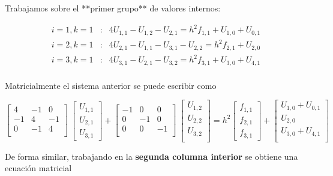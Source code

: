 \documentclass[12pt]{article}
\begin{document}
Trabajamos sobre el **primer grupo** de valores internos:

\begin{eqnarray*}
i=1,k=1 & : & 4 U_{1,1} - U_{1,2} - U_{2,1} = h^2 f_{1,1} + U_{1,0} + U_{0,1} \\
i=2,k=1 & : & 4 U_{2,1} - U_{1,1} - U_{3,1} - U_{2,2}= h^2 f_{2,1} + U_{2,0} \\
i=3,k=1 & : & 4 U_{3,1} - U_{2,1} - U_{3,2} = h^2 f_{3,1} + U_{3,0} + U_{4,1} \\
\end{eqnarray*}  

Matricialmente el sistema anterior se puede escribir como 

\begin{equation*}
\begin{bmatrix}
4 & -1 & 0 \\
-1 & 4 & -1 \\
0 & -1 & 4 \\ 
\end{bmatrix} \ 
\begin{bmatrix}
U_{1,1} \\ U_{2,1} \\ U_{3,1}
\end{bmatrix} +
\begin{bmatrix}
-1 & 0 & 0 \\
0 & -1 & 0 \\
0 & 0 & -1 \\
\end{bmatrix} \
\begin{bmatrix}
U_{1,2} \\ U_{2,2} \\ U_{3,2} \\
\end{bmatrix} = h^2
\begin{bmatrix}
f_{1,1} \\ f_{2,1} \\ f_{3,1}
\end{bmatrix} +
\begin{bmatrix}
U_{1,0} + U_{0,1} \\  U_{2,0} \\ U_{3,0} + U_{4,1} \\
\end{bmatrix}
\end{equation*}

De forma similar, trabajando en la \textbf{segunda columna interior} se obtiene una ecuación matricial
\end{document}
